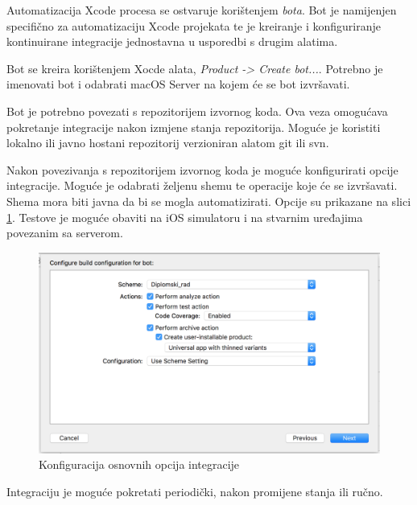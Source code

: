 \documentclass[times, utf8, diplomski, numeric]{fer}
\begin{document}
\begin{appendices}
Automatizacija Xcode procesa se ostvaruje korištenjem \textit{bota}. Bot je namijenjen specifično za automatizaciju Xcode projekata te je kreiranje i konfiguriranje kontinuirane integracije jednostavna u usporedbi s drugim alatima.

Bot se kreira korištenjem Xocde alata, \textit{Product -> Create bot...}. Potrebno je imenovati bot i odabrati macOS Server na kojem će se bot izvršavati.

Bot je potrebno povezati s repozitorijem izvornog koda. Ova veza omogućava pokretanje integracije nakon izmjene stanja repozitorija. Moguće je koristiti lokalno ili javno hostani repozitorij verzioniran alatom git ili svn.

Nakon povezivanja s repozitorijem izvornog koda je moguće konfigurirati opcije integracije. Moguće je odabrati željenu shemu te operacije koje će se izvršavati. Shema mora biti javna da bi se mogla automatizirati. Opcije su prikazane na slici \ref{fig:XcodeServerOptions}. Testove je moguće obaviti na iOS simulatoru i na stvarnim uređajima povezanim sa serverom.

\begin{figure}[h!]
    \centering
    \includegraphics[scale=0.5]{XcodeServerOptions}
    \caption{Konfiguracija osnovnih opcija integracije}
    \label{fig:XcodeServerOptions}
\end{figure}

Integraciju je moguće pokretati periodički, nakon promijene stanja ili ručno.


\end{appendices}
\end{document}
